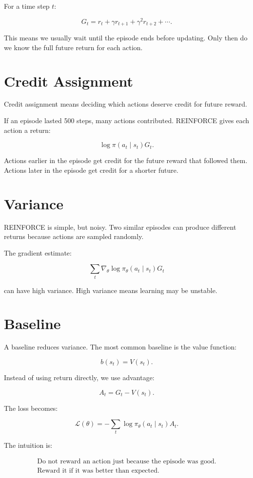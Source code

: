 \documentclass[11pt]{article}
\begin{document}
For a time step $t$:

\[
G_t
=
r_t + \gamma r_{t+1} + \gamma^2 r_{t+2} + \cdots.
\]

This means we usually wait until the episode ends before updating.
Only then do we know the full future return for each action.

\section{Credit Assignment}

Credit assignment means deciding which actions deserve credit for future reward.

If an episode lasted 500 steps, many actions contributed.
REINFORCE gives each action a return:

\[
\log \pi(a_t \mid s_t)G_t.
\]

Actions earlier in the episode get credit for the future reward that followed them.
Actions later in the episode get credit for a shorter future.

\section{Variance}

REINFORCE is simple, but noisy.
Two similar episodes can produce different returns because actions are sampled randomly.

The gradient estimate:

\[
\sum_t \nabla_\theta \log \pi_\theta(a_t \mid s_t)G_t
\]

can have high variance.
High variance means learning may be unstable.

\section{Baseline}

A baseline reduces variance.
The most common baseline is the value function:

\[
b(s_t) = V(s_t).
\]

Instead of using return directly, we use advantage:

\[
A_t = G_t - V(s_t).
\]

The loss becomes:

\[
\mathcal{L}(\theta)
=
-\sum_t \log \pi_\theta(a_t \mid s_t)A_t.
\]

The intuition is:

\[
\boxed{
\begin{gathered}
\text{Do not reward an action just because the episode was good.} \\
\text{Reward it if it was better than expected.}
\end{gathered}
}
\]
\end{document}
